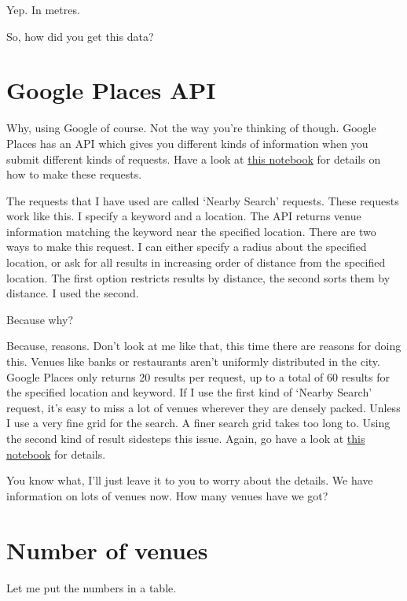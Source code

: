 Yep. In metres. 


{\color{blue} So, how did you get this data?}


\section{Google Places API}

Why, using Google of course. Not the way you're thinking of though. Google Places has an API which gives you different kinds of information when you submit different kinds of requests. Have a look at \href{https://github.com/saba-vadarevu/IBM-dataScience-Capstone/blob/master/final/intro_data.ipynb}{this notebook} for details on how to make these requests.

The requests that I have used are called `Nearby Search' requests. These requests work like this. I specify a keyword and a location. The API returns venue information matching the keyword near the specified location. There are two ways to make this request. I can either specify a radius about the specified location, or ask for all results in increasing order of distance from the specified location. The first option restricts results by distance, the second sorts them by distance. I used the second. 

{\color{blue} Because why?}

Because, reasons. Don't look at me like that, this time there are reasons for doing this. Venues like banks or restaurants aren't uniformly distributed in the city. Google Places only returns 20 results per request, up to a total of 60 results for the specified location and keyword. If I use the first kind of `Nearby Search' request, it's easy to miss a lot of venues wherever they are densely packed. Unless I use a very fine grid for the search. A finer search grid takes too long to. Using the second kind of result sidesteps this issue. Again, go have a look at \href{https://github.com/saba-vadarevu/IBM-dataScience-Capstone/blob/master/final/intro_data.ipynb}{this notebook} for details.

{\color{blue} You know what, I'll just leave it to you to worry about the details. We have information on lots of venues now. How many venues have we got? }

\section{Number of venues}
Let me put the numbers in a table. 

